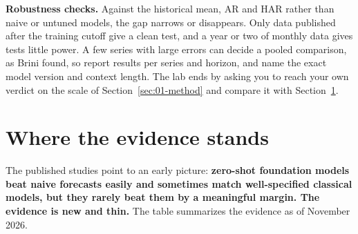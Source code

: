 \label{sec:21-stress}
\textbf{Robustness checks.} Against the historical mean, AR and HAR rather than naive or untuned models, the gap narrows or disappears. Only data published after the training cutoff give a clean test, and a year or two of monthly data gives tests little power. A few series with large errors can decide a pooled comparison, as Brini found, so report results per series and horizon, and name the exact model version and context length. The lab ends by asking you to reach your own verdict on the scale of Section~\ref{sec:01-method} and compare it with Section~\ref{sec:21-verdict}.

\section{Where the evidence stands}
\label{sec:21-verdict}

The published studies point to an early picture: \textbf{zero-shot foundation models beat naive forecasts easily and sometimes match well-specified classical models, but they rarely beat them by a meaningful margin. The evidence is new and thin.} The table summarizes the evidence as of November 2026.

